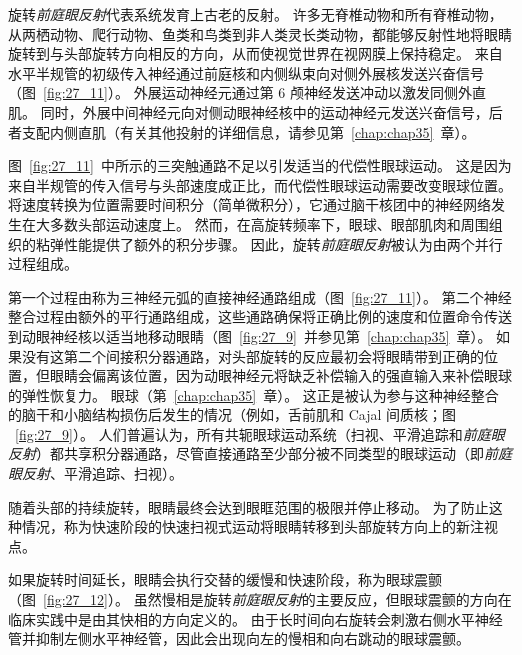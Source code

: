 旋转\textit{前庭眼反射}代表系统发育上古老的反射。
许多无脊椎动物和所有脊椎动物，从两栖动物、爬行动物、鱼类和鸟类到非人类灵长类动物，都能够反射性地将眼睛旋转到与头部旋转方向相反的方向，从而使视觉世界在视网膜上保持稳定。
来自水平半规管的初级传入神经通过前庭核和内侧纵束向对侧外展核发送兴奋信号（图~\ref{fig:27_11}）。
外展运动神经元通过第 6 颅神经发送冲动以激发同侧外直肌。
同时，外展中间神经元向对侧动眼神经核中的运动神经元发送兴奋信号，后者支配内侧直肌（有关其他投射的详细信息，请参见第~\ref{chap:chap35}~章）。


图~\ref{fig:27_11}~中所示的三突触通路不足以引发适当的代偿性眼球运动。
这是因为来自半规管的传入信号与头部速度成正比，而代偿性眼球运动需要改变眼球位置。
将速度转换为位置需要时间积分（简单微积分），它通过脑干核团中的神经网络发生在大多数头部运动速度上。
然而，在高旋转频率下，眼球、眼部肌肉和周围组织的粘弹性能提供了额外的积分步骤。
因此，旋转\textit{前庭眼反射}被认为由两个并行过程组成。


第一个过程由称为三神经元弧的直接神经通路组成（图~\ref{fig:27_11}）。
第二个神经整合过程由额外的平行通路组成，这些通路确保将正确比例的速度和位置命令传送到动眼神经核以适当地移动眼睛（图~\ref{fig:27_9}~并参见第~\ref{chap:chap35}~章）。
如果没有这第二个间接积分器通路，对头部旋转的反应最初会将眼睛带到正确的位置，但眼睛会偏离该位置，因为动眼神经元将缺乏补偿输入的强直输入来补偿眼球的弹性恢复力。
眼球（第~\ref{chap:chap35}~章）。
这正是被认为参与这种神经整合的脑干和小脑结构损伤后发生的情况（例如，舌前肌和 Cajal 间质核；图 ~\ref{fig:27_9}）。
人们普遍认为，所有共轭眼球运动系统（扫视、平滑追踪和\textit{前庭眼反射}）都共享积分器通路，尽管直接通路至少部分被不同类型的眼球运动（即\textit{前庭眼反射}、平滑追踪、扫视）。


随着头部的持续旋转，眼睛最终会达到眼眶范围的极限并停止移动。
为了防止这种情况，称为快速阶段的快速扫视式运动将眼睛转移到头部旋转方向上的新注视点。


如果旋转时间延长，眼睛会执行交替的缓慢和快速阶段，称为眼球震颤（图~\ref{fig:27_12}）。
虽然慢相是旋转\textit{前庭眼反射}的主要反应，但眼球震颤的方向在临床实践中是由其快相的方向定义的。
由于长时间向右旋转会刺激右侧水平神经管并抑制左侧水平神经管，因此会出现向左的慢相和向右跳动的眼球震颤。


